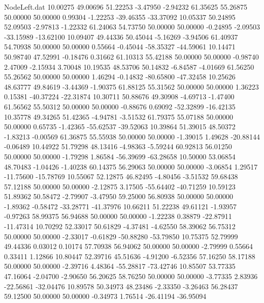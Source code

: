 \begin{filecontents}{NodeLeft.dat}
  10.00275   49.00696   51.22253    -3.47950   -2.94232   61.35625   55.26875   50.00000   50.00000    0.99304   -1.22253  -39.46355  -33.37092
  10.05337   50.24895   52.09503    -2.97813   -1.22332   61.24063   54.73750   50.00000   50.00000   -0.24895   -2.09503  -33.15989  -13.62100
  10.09407   49.44336   50.45044    -5.16269   -3.94506   61.40937   54.70938   50.00000   50.00000    0.55664   -0.45044  -58.35327  -44.59061
  10.14471   50.98740   47.52991    -0.18476    0.31662   61.10313   55.42188   50.00000   50.00000   -0.98740    2.47009   -2.15934    3.70048
  10.19535   48.53706   50.14832    -6.84587   -4.01669   61.56250   55.26562   50.00000   50.00000    1.46294   -0.14832  -80.65800  -47.32458
  10.25626   48.63777   49.84619    -3.44369   -1.90375   61.88125   55.31562   50.00000   50.00000    1.36223    0.15381  -40.37224  -22.31874
  10.30711   50.88676   49.30908    -4.69713   -1.47400   61.56562   55.50312   50.00000   50.00000   -0.88676    0.69092  -52.32899  -16.42135
  10.35778   49.34265   51.42365    -4.94781   -3.51532   61.79375   55.07188   50.00000   50.00000    0.65735   -1.42365  -55.62537  -39.52063
  10.39864   51.39015   48.50372    -1.83213   -0.00569   61.36875   55.55938   50.00000   50.00000   -1.39015    1.49628  -20.88144   -0.06489
  10.44922   51.79298   48.13416    -4.98363   -5.59244   60.92813   56.01250   50.00000   50.00000   -1.79298    1.86584  -56.39699  -63.28658
  10.50000   53.06854   48.70483    -1.04426   -1.40238   60.14375   56.29063   50.00000   50.00000   -3.06854    1.29517  -11.75600  -15.78769
  10.55067   52.12875   46.82495    -4.80456   -3.51532   59.68438   57.12188   50.00000   50.00000   -2.12875    3.17505  -55.64402  -40.71259
  10.59123   51.89362   50.58472    -2.79907   -3.47950   59.25000   56.80938   50.00000   50.00000   -1.89362   -0.58472  -33.28771  -41.37976
  10.66211   51.22238   49.61121    -1.93957   -0.97263   58.99375   56.94688   50.00000   50.00000   -1.22238    0.38879  -22.87911  -11.47314
  10.70292   52.33017   50.61829    -4.37481   -4.62550   58.39062   56.75312   50.00000   50.00000   -2.33017   -0.61829  -50.88280  -53.79850
  10.75375   52.79999   49.44336     0.03012    0.10174   57.70938   56.94062   50.00000   50.00000   -2.79999    0.55664    0.33411    1.12866
  10.80447   52.39716   45.51636    -4.91200   -6.52356   57.16250   58.17188   50.00000   50.00000   -2.39716    4.48364  -55.28817  -73.42746
  10.85507   53.77335   47.16064    -2.04700   -2.90650   56.20625   58.76250   50.00000   50.00000   -3.77335    2.83936  -22.56861  -32.04476
  10.89578   50.34973   48.23486    -2.33350   -3.26463   56.28437   59.12500   50.00000   50.00000   -0.34973    1.76514  -26.41194  -36.95094

\end{filecontents}
